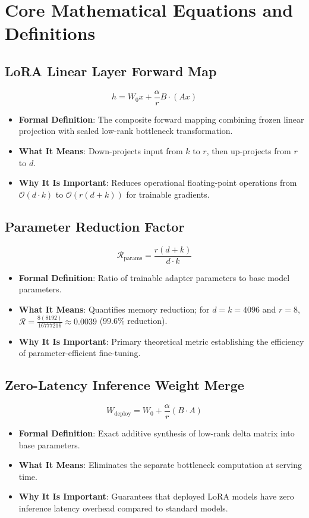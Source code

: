 \documentclass[11pt,a4paper]{article}
\theoremstyle{definition}
\begin{document}
\section{Core Mathematical Equations and Definitions}

\subsection{LoRA Linear Layer Forward Map}
{\boldmath
\begin{equation}
h = W_0 x + \frac{\alpha}{r} B \cdot (A x)
\end{equation}
}
\begin{itemize}
    \item \textbf{Formal Definition}: The composite forward mapping combining frozen linear projection with scaled low-rank bottleneck transformation.
    \item \textbf{What It Means}: Down-projects input from $k$ to $r$, then up-projects from $r$ to $d$.
    \item \textbf{Why It Is Important}: Reduces operational floating-point operations from $\mathcal{O}(d \cdot k)$ to $\mathcal{O}(r(d + k))$ for trainable gradients.
\end{itemize}

\subsection{Parameter Reduction Factor}
{\boldmath
\begin{equation}
\mathcal{R}_{\text{params}} = \frac{r(d + k)}{d \cdot k}
\end{equation}
}
\begin{itemize}
    \item \textbf{Formal Definition}: Ratio of trainable adapter parameters to base model parameters.
    \item \textbf{What It Means}: Quantifies memory reduction; for $d = k = 4096$ and $r = 8$, $\mathcal{R} = \frac{8(8192)}{16777216} \approx 0.0039$ (99.6\% reduction).
    \item \textbf{Why It Is Important}: Primary theoretical metric establishing the efficiency of parameter-efficient fine-tuning.
\end{itemize}

\subsection{Zero-Latency Inference Weight Merge}
{\boldmath
\begin{equation}
W_{\text{deploy}} = W_0 + \frac{\alpha}{r} (B \cdot A)
\end{equation}
}
\begin{itemize}
    \item \textbf{Formal Definition}: Exact additive synthesis of low-rank delta matrix into base parameters.
    \item \textbf{What It Means}: Eliminates the separate bottleneck computation at serving time.
    \item \textbf{Why It Is Important}: Guarantees that deployed LoRA models have zero inference latency overhead compared to standard models.
\end{itemize}
\end{document}
